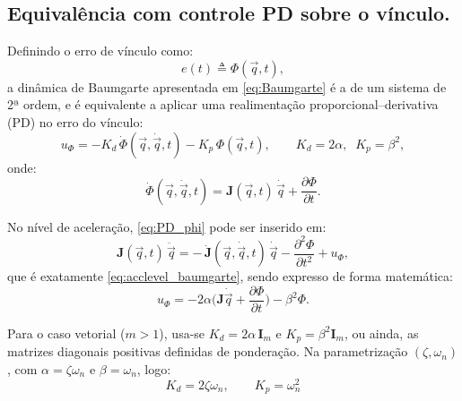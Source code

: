 \subsection{Equivalência com controle PD sobre o vínculo.}
Definindo o erro de vínculo como:
\begin{equation}
e(t)\triangleq \Phi(\vec q,t),
\end{equation}
a dinâmica de Baumgarte apresentada em \eqref{eq:Baumgarte}
é a de um sistema de 2ª ordem, e é equivalente a aplicar uma realimentação proporcional--derivativa (PD) no erro do vínculo:
\begin{equation}
u_{\Phi}=
-K_d\,\dot{\Phi}(\vec q,\dot{\vec q},t)
-K_p\,\Phi(\vec q,t),
\qquad
K_d = 2\alpha,\;\; K_p = \beta^2,
\label{eq:PD_phi}
\end{equation}
onde:
\begin{equation}
\dot{\Phi}(\vec q, \dot{\vec q}, t) = \mathbf{J}(\vec q,t)\,\dot{\vec q} + \frac{\partial \Phi}{\partial t}.
\end{equation}

No nível de aceleração, \eqref{eq:PD_phi} pode ser inserido em:
\begin{equation}
\mathbf{J}(\vec q,t)\,\ddot{\vec q}
= -\,\dot{\mathbf{J}}(\vec q,\dot{\vec q},t)\,\dot{\vec q}
- \frac{\partial^2 \Phi}{\partial t^2}
+ u_{\Phi},
\end{equation}
que é exatamente \eqref{eq:acclevel_baumgarte}, sendo expresso de forma matemática:
\begin{equation}
u_{\Phi}=
-2\alpha\big(\mathbf{J}\dot{\vec q}
+\frac{\partial \Phi}{\partial t}\big)
-\beta^2 \Phi.
\end{equation}

Para o caso vetorial ($m>1$), usa-se $K_d=2\alpha\,\mathbf I_m$ e $K_p=\beta^2 \mathbf I_m$,
ou ainda, as matrizes diagonais positivas definidas de ponderação.
Na parametrização $(\zeta,\omega_n)$,
com $\alpha=\zeta\omega_n$ e $\beta=\omega_n$, logo:
\begin{equation}
K_d = 2 \zeta \omega_n,
\qquad
K_p = \omega_n^2
\end{equation}

